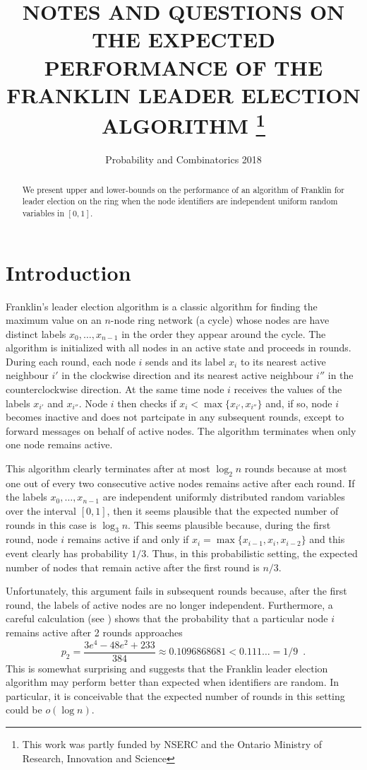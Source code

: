 \documentclass{patmorin}
\title{\MakeUppercase{Notes and Questions on the Expected Performance 
   of the Franklin Leader Election Algorithm}%
   \thanks{This work was partly funded by NSERC and the Ontario Ministry of
    Research, Innovation and Science}}
\author{Probability and Combinatorics 2018}
\begin{document}
\maketitle
%
\begin{abstract}
  We present upper and lower-bounds on the performance of an algorithm
  of Franklin for leader election on the ring when the node identifiers
  are independent uniform random variables in $[0,1]$.
\end{abstract}
%
%


\section{Introduction}

Franklin's leader election algorithm is a classic algorithm for finding
the maximum value on an $n$-node ring network (a cycle) whose nodes
are have distinct labels $x_0,\ldots,x_{n-1}$ in the order they appear
around the cycle.  The algorithm is initialized with all nodes in an
active state and proceeds in rounds.  During each round, each node
$i$ sends and its label $x_i$ to its nearest active neighbour $i'$ in
the clockwise direction and its nearest active neighbour $i''$ in the
counterclockwise direction.  At the same time node $i$ receives the values
of the labels $x_{i'}$ and $x_{i''}$.  Node $i$ then checks if $x_i <
\max\{x_{i'},x_{i''}\}$ and, if so, node $i$ becomes inactive and does
not partcipate in any subsequent rounds, except to forward messages on
behalf of active nodes.  The algorithm terminates when only one node
remains active.

This algorithm clearly terminates after at most $\log_2 n$ rounds because
at most one out of every two consecutive active nodes remains active after
each round.  If the labels $x_0,\ldots,x_{n-1}$ are independent uniformly
distributed random variables over the interval $[0,1]$, then it seems
plausible that the expected number of rounds in this case is $\log_3 n$.
This seems plausible because, during the first round, node $i$ remains
active if and only if $x_i=\max\{x_{i-1},x_i,x_{i-2}\}$ and this event
clearly has probability $1/3$. Thus, in this probabilistic setting,
the expected number of nodes that remain active after the first round
is $n/3$.

Unfortunately, this argument fails in subsequent rounds because,
after the first round, the labels of active nodes are no longer
independent. Furthermore, a careful calculation (see ) shows
that the probability that a particular node $i$ remains active after 2
rounds approaches
\[
    p_2 = \frac{3e^4 - 48e^2 + 233}{384} \approx 0.1096868681 < 0.111\ldots = 1/9 \enspace .
\]
This is somewhat surprising and suggests that the Franklin leader election algorithm may perform better than expected when identifiers are random.  In particular, it is conceivable that the expected number of rounds in this setting could be $o(\log n)$.
\end{document}
